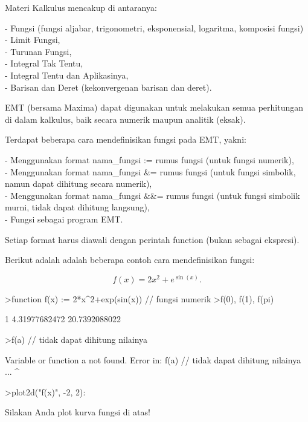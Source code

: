 \documentclass[a4paper,10pt]{article}
\begin{document}
\begin{eulernotebook}
\begin{eulercomment}
Materi Kalkulus mencakup di antaranya:

- Fungsi (fungsi aljabar, trigonometri, eksponensial, logaritma, komposisi fungsi)\\
- Limit Fungsi,\\
- Turunan Fungsi,\\
- Integral Tak Tentu,\\
- Integral Tentu dan Aplikasinya,\\
- Barisan dan Deret (kekonvergenan barisan dan deret).

EMT (bersama Maxima) dapat digunakan untuk melakukan semua perhitungan di dalam kalkulus, baik secara numerik maupun analitik
(eksak).

\end{eulercomment}
\begin{eulercomment}
Terdapat beberapa cara mendefinisikan fungsi pada EMT, yakni:

- Menggunakan format nama\_fungsi := rumus fungsi (untuk fungsi numerik),\\
- Menggunakan format nama\_fungsi \&= rumus fungsi (untuk fungsi simbolik, namun dapat dihitung secara numerik),\\
- Menggunakan format nama\_fungsi \&\&= rumus fungsi (untuk fungsi simbolik murni, tidak dapat dihitung langsung),\\
- Fungsi sebagai program EMT.

Setiap format harus diawali dengan perintah function (bukan sebagai ekspresi).

Berikut adalah adalah beberapa contoh cara mendefinisikan fungsi:

\end{eulercomment}
\begin{eulerformula}
\[
f(x)=2x^2+e^{\sin(x)}.
\]
\end{eulerformula}
\begin{eulerprompt}
>function f(x) := 2*x^2+exp(sin(x)) // fungsi numerik
>f(0), f(1), f(pi)
\end{eulerprompt}
\begin{euleroutput}
  1
  4.31977682472
  20.7392088022
\end{euleroutput}
\begin{eulerprompt}
>f(a) // tidak dapat dihitung nilainya 
\end{eulerprompt}
\begin{euleroutput}
  Variable or function a not found.
  Error in:
  f(a) // tidak dapat dihitung nilainya  ...
     ^
\end{euleroutput}
\begin{eulerprompt}
>plot2d("f(x)", -2, 2):
\end{eulerprompt}
\begin{eulercomment}
Silakan Anda plot kurva fungsi di atas!


\end{eulercomment}
\end{eulernotebook}
\end{document}
